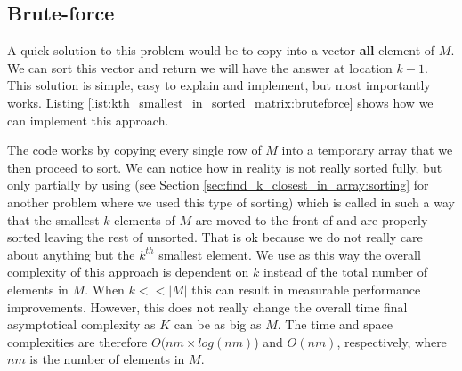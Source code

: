 \subsection{Brute-force}
\label{kth_smallest_in_sorted_matrix:sec:bruteforce}
A quick solution to this problem would be to copy into a vector \textbf{all} element of $M$. We can sort this vector and return we will have the answer at location  $k-1$. 
This solution is simple, easy to explain and implement, but most importantly works. Listing \ref{list:kth_smallest_in_sorted_matrix:bruteforce} shows how we can implement this approach.



The code works by copying every single row of $M$ into a temporary array  that we then proceed to sort. We can notice how in reality  is not really sorted fully, but only partially by using \cite{cit::std::partialsort} (see Section \ref{sec:find_k_closest_in_array:sorting} for another problem where we used this type of sorting) which is called in such a way that the smallest $k$ elements of $M$ are moved to the front of  and are properly sorted leaving the rest of  unsorted. That is ok because we do not really care about anything but the $k^{th}$ smallest element. We use  as this way the overall complexity of this approach is dependent on $k$ instead of the total number of elements in $M$. When $k << |M|$ this can result in measurable performance improvements. However, this does not really change the overall time final asymptotical complexity as $K$ can be as big as $M$.
The time and space complexities are therefore $O(nm\times log(nm)$) and $O(nm)$, respectively, where $nm$ is the number of elements in $M$.

